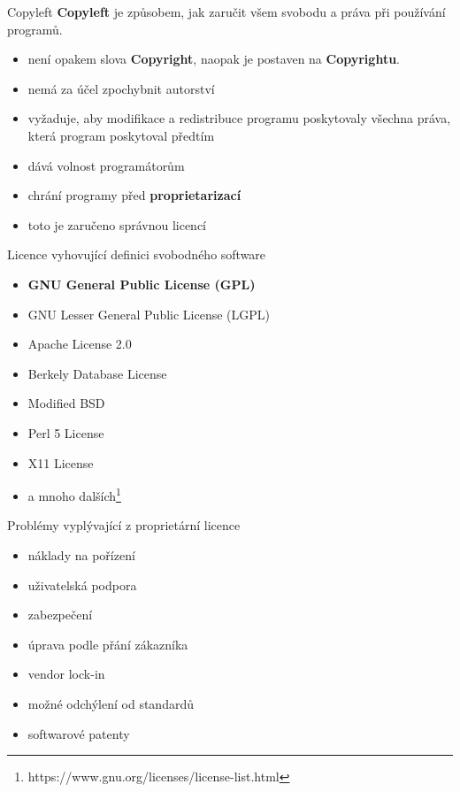 \documentclass[11pt]{beamer}
\begin{document}
	\begin{frame}{Copyleft}
	\textbf{Copyleft} je způsobem, jak zaručit všem svobodu a práva při používání programů.
	\begin{itemize}
		\item není opakem slova \textbf{Copyright}, naopak je postaven na \textbf{Copyrightu}.
		\item nemá za účel zpochybnit autorství
		\item vyžaduje, aby modifikace a redistribuce programu poskytovaly všechna práva, která program poskytoval předtím
		\item dává volnost programátorům
		\item chrání programy před \textbf{proprietarizací}
		\item toto je zaručeno správnou licencí
	\end{itemize}
\end{frame}	
	
\begin{frame}{Licence vyhovující definici svobodného software}
	\begin{itemize}
		\item \textbf{GNU General Public License (GPL)}
		\item GNU Lesser General Public License (LGPL)
		\item Apache License 2.0
		\item Berkely Database License
		\item Modified BSD
		\item Perl 5 License
		\item X11 License
		\item a mnoho dalších\footnote{https://www.gnu.org/licenses/license-list.html}
	\end{itemize}
\end{frame}

\begin{frame}{Problémy vyplývající z proprietární licence}
	\begin{itemize}
		\item náklady na pořízení
		\item uživatelská podpora
		\item zabezpečení
		\item úprava podle přání zákazníka
		\item vendor lock-in
		\item možné odchýlení od standardů
		\item softwarové patenty
	\end{itemize}
\end{frame}
\end{document}
